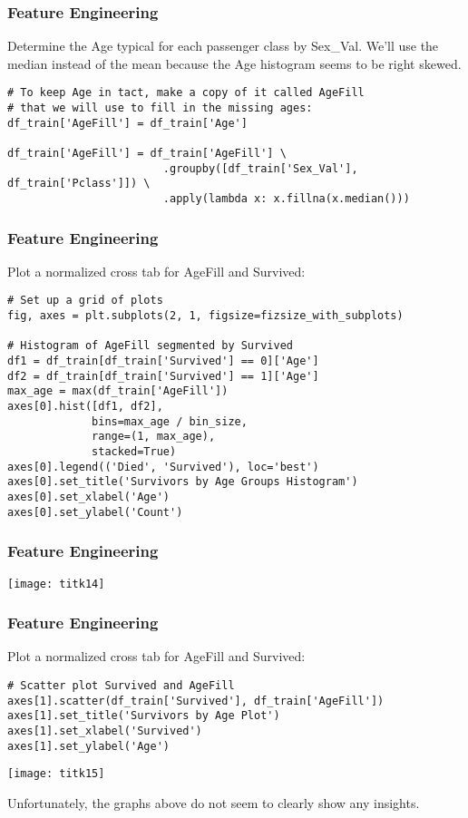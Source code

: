 \begin{frame}[fragile]\frametitle{Feature Engineering}
Determine the Age typical for each passenger class by Sex\_Val. We'll use the median instead of the mean because the Age histogram seems to be right skewed.
\begin{lstlisting}
# To keep Age in tact, make a copy of it called AgeFill 
# that we will use to fill in the missing ages:
df_train['AgeFill'] = df_train['Age']

df_train['AgeFill'] = df_train['AgeFill'] \
                        .groupby([df_train['Sex_Val'], df_train['Pclass']]) \
                        .apply(lambda x: x.fillna(x.median()))
\end{lstlisting}
\end{frame}

\begin{frame}[fragile]\frametitle{Feature Engineering}
Plot a normalized cross tab for AgeFill and Survived:
\begin{lstlisting}
# Set up a grid of plots
fig, axes = plt.subplots(2, 1, figsize=fizsize_with_subplots)

# Histogram of AgeFill segmented by Survived
df1 = df_train[df_train['Survived'] == 0]['Age']
df2 = df_train[df_train['Survived'] == 1]['Age']
max_age = max(df_train['AgeFill'])
axes[0].hist([df1, df2], 
             bins=max_age / bin_size, 
             range=(1, max_age), 
             stacked=True)
axes[0].legend(('Died', 'Survived'), loc='best')
axes[0].set_title('Survivors by Age Groups Histogram')
axes[0].set_xlabel('Age')
axes[0].set_ylabel('Count')
\end{lstlisting}
\end{frame}

\begin{frame}[fragile]\frametitle{Feature Engineering}
\begin{center}
\texttt{[image: titk14]}
\end{center}
\end{frame}

\begin{frame}[fragile]\frametitle{Feature Engineering}
Plot a normalized cross tab for AgeFill and Survived:
\begin{lstlisting}
# Scatter plot Survived and AgeFill
axes[1].scatter(df_train['Survived'], df_train['AgeFill'])
axes[1].set_title('Survivors by Age Plot')
axes[1].set_xlabel('Survived')
axes[1].set_ylabel('Age')
\end{lstlisting}
\begin{center}
\texttt{[image: titk15]}
\end{center}
Unfortunately, the graphs above do not seem to clearly show any insights.
\end{frame}

